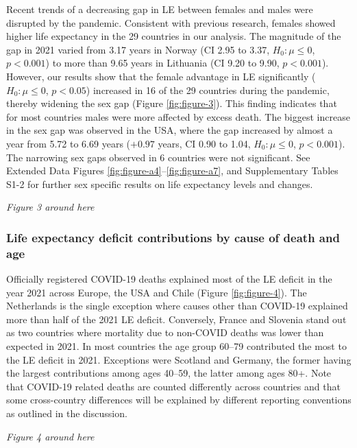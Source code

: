 \documentclass[12pt]{article}
\begin{document}
Recent trends of a decreasing gap in LE between females and males\cite{Zarulli2021} were disrupted by the pandemic. Consistent with previous research, females showed higher life expectancy in the 29 countries in our analysis.
The magnitude of the gap in 2021 varied from 3.17 years in Norway (CI 2.95 to 3.37, $H_0: \mu \leq 0$, $p < 0.001$) to more than 9.65 years in Lithuania (CI 9.20 to 9.90, $p < 0.001$).
However, our results show that the female advantage in LE significantly ($H_0: \mu \leq 0$, $p<0.05$) increased in 16 of the 29 countries during the pandemic, thereby widening the sex gap (Figure \ref{fig:figure-3}).
This finding indicates that for most countries males were more affected by excess death.
The biggest increase in the sex gap was observed in the USA, where the gap increased by almost a year from 5.72 to 6.69 years ($+0.97$ years, CI 0.90 to 1.04, $H_0: \mu \leq 0$, $p < 0.001$).
The narrowing sex gaps observed in 6 countries were not significant. See Extended Data Figures \ref{fig:figure-a4}--\ref{fig:figure-a7}, and Supplementary Tables S1-2 for further sex specific results on life expectancy levels and changes.

\par\medskip
\emph{Figure 3 around here}
\par\medskip

\subsubsection*{Life expectancy deficit contributions by cause of death and age}

Officially registered COVID-19 deaths explained most of the LE deficit in the year 2021 across Europe, the USA and Chile (Figure \ref{fig:figure-4}). The Netherlands is the single exception where causes other than COVID-19 explained more than half of the 2021 LE deficit. Conversely, France and Slovenia stand out as two countries where mortality due to non-COVID deaths was lower than expected in 2021. In most countries the age group 60--79 contributed the most to the LE deficit in 2021. Exceptions were Scotland and Germany, the former having the largest contributions among ages 40--59, the latter among ages 80+. Note that COVID-19 related deaths are counted differently across countries and that some cross-country differences will be explained by different reporting conventions as outlined in the discussion.

\par\medskip
\emph{Figure 4 around here}
\par\medskip
\end{document}
